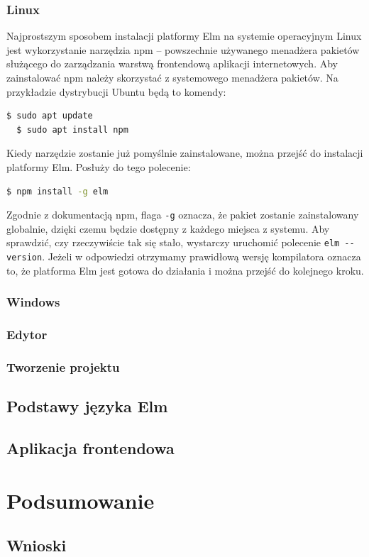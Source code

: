 \documentclass[twoside,a4paper]{report}
\begin{document}
\subsection{Linux}
Najprostszym sposobem instalacji platformy Elm na systemie operacyjnym Linux jest wykorzystanie narzędzia npm -- powszechnie używanego menadżera pakietów służącego do zarządzania warstwą frontendową aplikacji internetowych.
Aby zainstalować npm należy skorzystać z systemowego menadżera pakietów.
Na przykładzie dystrybucji Ubuntu będą to komendy:
\begin{lstlisting}[language=bash]
  $ sudo apt update
  $ sudo apt install npm
\end{lstlisting}
Kiedy narzędzie zostanie już pomyślnie zainstalowane, można przejść do instalacji platformy Elm.
Posłuży do tego polecenie:
\begin{lstlisting}[language=bash]
  $ npm install -g elm
\end{lstlisting}
Zgodnie z dokumentacją npm\cite{npmdocs}, flaga \verb|-g| oznacza, że pakiet zostanie zainstalowany globalnie, dzięki czemu będzie dostępny z każdego miejsca z systemu.
Aby sprawdzić, czy rzeczywiście tak się stało, wystarczy uruchomić polecenie \verb|elm --version|.
Jeżeli w odpowiedzi otrzymamy prawidłową wersję kompilatora oznacza to, że platforma Elm jest gotowa do działania i można przejść do kolejnego kroku.

\subsection{Windows}

\subsection{Edytor}

\subsection{Tworzenie projektu}

\section{Podstawy języka Elm}

\section{Aplikacja frontendowa}


\chapter{Podsumowanie}

\section{Wnioski}


\listoffigures
\lstlistoflistings

\printbibliography

\end{document}
